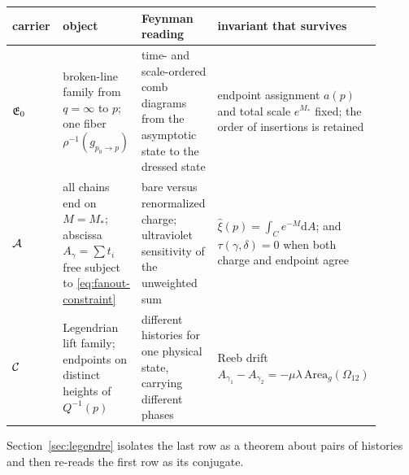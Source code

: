 \begin{center}\small
\renewcommand{\arraystretch}{1.25}
\begin{tabular}{@{}p{0.19\linewidth}p{0.24\linewidth}p{0.24\linewidth}p{0.23\linewidth}@{}}
\toprule
carrier & \AEG{} object & Feynman reading & invariant that survives \\
\midrule
$\mathfrak{E}_0$ & broken-line family from $q=\infty$ to $p$; one fiber
$\rho^{-1}(g_{p_0\to p})$
& time- and scale-ordered comb diagrams from the asymptotic state to the dressed
state
& endpoint assignment $a(p)$ and total scale $e^{M_*}$ fixed; the order of
insertions is retained \\
$\mathcal{A}$ & all chains end on $M=M_*$; abscissa $A_\gamma=\sum t_i$ free subject to
\eqref{eq:fanout-constraint}
& bare versus renormalized charge; ultraviolet sensitivity of the unweighted sum
& $\hat\xi(p)=\int_{C}e^{-M}\mathrm dA$; and
$\tau(\gamma,\delta)=0$ when both charge and endpoint agree \\
$\mathcal{C}$ & Legendrian lift family; endpoints on distinct heights of
$Q^{-1}(p)$
& different histories for one physical state, carrying different phases
& Reeb drift $A_{\gamma_1}-A_{\gamma_2}
=-\mu\lambda\,\mathrm{Area}_g(\Omega_{12})$ \\
\bottomrule
\end{tabular}
\end{center}

Section~\ref{sec:legendre} isolates the last row as a theorem about pairs of
histories and then re-reads the first row as its conjugate.
